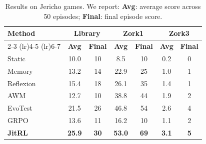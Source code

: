 \begin{table}[ht]
\vspace{-4mm}
    \caption{Results on Jericho games. We report: \textbf{Avg}: average score across 50 episodes; \textbf{Final}: final episode score.}
    \label{tab:jericho_results}
    \begin{center}
    \begin{small}
    \begin{tabular}{lcccccc}
    \toprule
    \multirow{2}{*}{\textbf{Method}} & \multicolumn{2}{c}{\textbf{Library}} & \multicolumn{2}{c}{\textbf{Zork1}} & \multicolumn{2}{c}{\textbf{Zork3}} \\
    \cmidrule(lr){2-3} \cmidrule(lr){4-5} \cmidrule(lr){6-7}
    & \textbf{Avg} & \textbf{Final} & \textbf{Avg} & \textbf{Final} & \textbf{Avg} & \textbf{Final} \\
    \midrule
    Static & 10.0 & 10 & 8.5 & 10 & 0.2 & 0 \\
    Memory & 13.2 & 14 & 22.9 & 25 & 1.0 & 1 \\
    Reflexion & 15.4 & 18 & 26.1 & 35 & 1.4 & 1 \\
    AWM & 12.7 & 10 & 38.8 & 44 & 1.9 & 2 \\
    EvoTest & 21.5 & 26 & 46.8 & 54 & 2.6 & 4 \\
    \midrule
    GRPO & 13.6 & 11 & 16.2 & 10 & 1.1 & 2 \\
    
    \midrule
    \textbf{JitRL} & \textbf{25.9} & \textbf{30} & \textbf{53.0} & \textbf{69} & \textbf{3.1} & \textbf{5} \\
    \bottomrule
    \end{tabular}
    \vspace{-4mm}
    \end{small}
    \end{center}
\end{table}
